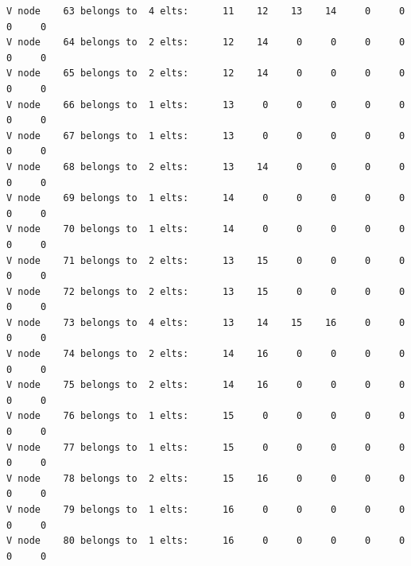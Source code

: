\begin{small}
\begin{verbatim}
V node    63 belongs to  4 elts:      11    12    13    14     0     0     0     0
V node    64 belongs to  2 elts:      12    14     0     0     0     0     0     0
V node    65 belongs to  2 elts:      12    14     0     0     0     0     0     0
V node    66 belongs to  1 elts:      13     0     0     0     0     0     0     0
V node    67 belongs to  1 elts:      13     0     0     0     0     0     0     0
V node    68 belongs to  2 elts:      13    14     0     0     0     0     0     0
V node    69 belongs to  1 elts:      14     0     0     0     0     0     0     0
V node    70 belongs to  1 elts:      14     0     0     0     0     0     0     0
V node    71 belongs to  2 elts:      13    15     0     0     0     0     0     0
V node    72 belongs to  2 elts:      13    15     0     0     0     0     0     0
V node    73 belongs to  4 elts:      13    14    15    16     0     0     0     0
V node    74 belongs to  2 elts:      14    16     0     0     0     0     0     0
V node    75 belongs to  2 elts:      14    16     0     0     0     0     0     0
V node    76 belongs to  1 elts:      15     0     0     0     0     0     0     0
V node    77 belongs to  1 elts:      15     0     0     0     0     0     0     0
V node    78 belongs to  2 elts:      15    16     0     0     0     0     0     0
V node    79 belongs to  1 elts:      16     0     0     0     0     0     0     0
V node    80 belongs to  1 elts:      16     0     0     0     0     0     0     0


\end{verbatim}
\end{small}
